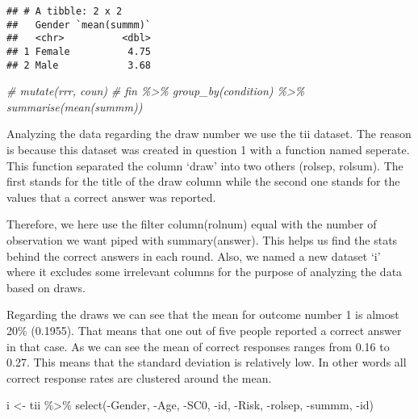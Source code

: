 \documentclass[
]{article}
\newenvironment{Shaded}{\begin{snugshade}}{\end{snugshade}}
\newcommand{\CommentTok}[1]{\textcolor[rgb]{0.56,0.35,0.01}{\textit{#1}}}
\newcommand{\FunctionTok}[1]{\textcolor[rgb]{0.00,0.00,0.00}{#1}}
\newcommand{\NormalTok}[1]{#1}
\newcommand{\OtherTok}[1]{\textcolor[rgb]{0.56,0.35,0.01}{#1}}
\newcommand{\SpecialCharTok}[1]{\textcolor[rgb]{0.00,0.00,0.00}{#1}}
\begin{document}
\begin{enumerate}
\begin{verbatim}
## # A tibble: 2 x 2
##   Gender `mean(summm)`
##   <chr>          <dbl>
## 1 Female          4.75
## 2 Male            3.68
\end{verbatim}

\begin{Shaded}
\begin{Highlighting}[]
\CommentTok{\# mutate(rrr, coun)}
\CommentTok{\# fin \%\textgreater{}\% group\_by(condition) \%\textgreater{}\% summarise(mean(summm))}
\end{Highlighting}
\end{Shaded}

  Analyzing the data regarding the draw number we use the tii dataset.
  The reason is because this dataset was created in question 1 with a
  function named seperate. This function separated the column `draw'
  into two others (rolsep, rolsum). The first stands for the title of
  the draw column while the second one stands for the values that a
  correct answer was reported.

  Therefore, we here use the filter column(rolnum) equal with the number
  of observation we want piped with summary(answer). This helps us find
  the stats behind the correct answers in each round. Also, we named a
  new dataset `i' where it excludes some irrelevant columns for the
  purpose of analyzing the data based on draws.

  Regarding the draws we can see that the mean for outcome number 1 is
  almost 20\% (0.1955). That means that one out of five people reported
  a correct answer in that case. As we can see the mean of correct
  responses ranges from 0.16 to 0.27. This means that the standard
  deviation is relatively low. In other words all correct response rates
  are clustered around the mean.

\begin{Shaded}
\begin{Highlighting}[]
\NormalTok{i }\OtherTok{\textless{}{-}}\NormalTok{ tii }\SpecialCharTok{\%\textgreater{}\%} \FunctionTok{select}\NormalTok{(}\SpecialCharTok{{-}}\NormalTok{Gender, }\SpecialCharTok{{-}}\NormalTok{Age, }\SpecialCharTok{{-}}\NormalTok{SC0, }\SpecialCharTok{{-}}\NormalTok{id, }\SpecialCharTok{{-}}\NormalTok{Risk, }\SpecialCharTok{{-}}\NormalTok{rolsep, }\SpecialCharTok{{-}}\NormalTok{summm, }\SpecialCharTok{{-}}\NormalTok{id)}
\end{Highlighting}
\end{Shaded}


\end{enumerate}
\end{document}
